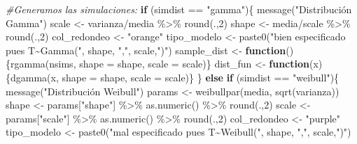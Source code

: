 \documentclass[
]{article}
\newenvironment{Shaded}{\begin{snugshade}}{\end{snugshade}}
\newcommand{\AttributeTok}[1]{\textcolor[rgb]{0.77,0.63,0.00}{#1}}
\newcommand{\CommentTok}[1]{\textcolor[rgb]{0.56,0.35,0.01}{\textit{#1}}}
\newcommand{\ControlFlowTok}[1]{\textcolor[rgb]{0.13,0.29,0.53}{\textbf{#1}}}
\newcommand{\DecValTok}[1]{\textcolor[rgb]{0.00,0.00,0.81}{#1}}
\newcommand{\FunctionTok}[1]{\textcolor[rgb]{0.00,0.00,0.00}{#1}}
\newcommand{\NormalTok}[1]{#1}
\newcommand{\OtherTok}[1]{\textcolor[rgb]{0.56,0.35,0.01}{#1}}
\newcommand{\SpecialCharTok}[1]{\textcolor[rgb]{0.00,0.00,0.00}{#1}}
\newcommand{\StringTok}[1]{\textcolor[rgb]{0.31,0.60,0.02}{#1}}
\begin{document}
\begin{Shaded}
\begin{Highlighting}[]
\CommentTok{\#Generamos las simulaciones:}
\ControlFlowTok{if}\NormalTok{ (simdist }\SpecialCharTok{==} \StringTok{"gamma"}\NormalTok{)\{}
  \FunctionTok{message}\NormalTok{(}\StringTok{"Distribución Gamma"}\NormalTok{)}
\NormalTok{  scale        }\OtherTok{\textless{}{-}}\NormalTok{ varianza}\SpecialCharTok{/}\NormalTok{media  }\SpecialCharTok{\%\textgreater{}\%} \FunctionTok{round}\NormalTok{(.,}\DecValTok{2}\NormalTok{)}
\NormalTok{  shape        }\OtherTok{\textless{}{-}}\NormalTok{ media}\SpecialCharTok{/}\NormalTok{scale     }\SpecialCharTok{\%\textgreater{}\%} \FunctionTok{round}\NormalTok{(.,}\DecValTok{2}\NormalTok{)}
\NormalTok{  col\_redondeo }\OtherTok{\textless{}{-}} \StringTok{"orange"}
\NormalTok{  tipo\_modelo  }\OtherTok{\textless{}{-}} \FunctionTok{paste0}\NormalTok{(}\StringTok{"bien especificado pues T\textasciitilde{}Gamma("}\NormalTok{, }
\NormalTok{                         shape, }\StringTok{","}\NormalTok{, scale,}\StringTok{")"}\NormalTok{)}
\NormalTok{  sample\_dist  }\OtherTok{\textless{}{-}} \ControlFlowTok{function}\NormalTok{()\{}\FunctionTok{rgamma}\NormalTok{(nsims, }\AttributeTok{shape =}\NormalTok{ shape, }\AttributeTok{scale =}\NormalTok{ scale)\}}
\NormalTok{  dist\_fun     }\OtherTok{\textless{}{-}} \ControlFlowTok{function}\NormalTok{(x)\{}\FunctionTok{dgamma}\NormalTok{(x, }\AttributeTok{shape =}\NormalTok{ shape, }\AttributeTok{scale =}\NormalTok{ scale)\}}
\NormalTok{\} }\ControlFlowTok{else} \ControlFlowTok{if}\NormalTok{ (simdist }\SpecialCharTok{==} \StringTok{"weibull"}\NormalTok{)\{}
  \FunctionTok{message}\NormalTok{(}\StringTok{"Distribución Weibull"}\NormalTok{)}
\NormalTok{  params       }\OtherTok{\textless{}{-}} \FunctionTok{weibullpar}\NormalTok{(media, }\FunctionTok{sqrt}\NormalTok{(varianza))}
\NormalTok{  shape        }\OtherTok{\textless{}{-}}\NormalTok{ params[}\StringTok{"shape"}\NormalTok{] }\SpecialCharTok{\%\textgreater{}\%} \FunctionTok{as.numeric}\NormalTok{() }\SpecialCharTok{\%\textgreater{}\%} \FunctionTok{round}\NormalTok{(.,}\DecValTok{2}\NormalTok{)}
\NormalTok{  scale        }\OtherTok{\textless{}{-}}\NormalTok{ params[}\StringTok{"scale"}\NormalTok{] }\SpecialCharTok{\%\textgreater{}\%} \FunctionTok{as.numeric}\NormalTok{() }\SpecialCharTok{\%\textgreater{}\%} \FunctionTok{round}\NormalTok{(.,}\DecValTok{2}\NormalTok{)}
\NormalTok{  col\_redondeo }\OtherTok{\textless{}{-}} \StringTok{"purple"}
\NormalTok{  tipo\_modelo  }\OtherTok{\textless{}{-}} \FunctionTok{paste0}\NormalTok{(}\StringTok{"mal especificado pues T\textasciitilde{}Weibull("}\NormalTok{, }
\NormalTok{                         shape, }\StringTok{","}\NormalTok{, scale,}\StringTok{")"}\NormalTok{)}

\end{Highlighting}
\end{Shaded}
\end{document}
